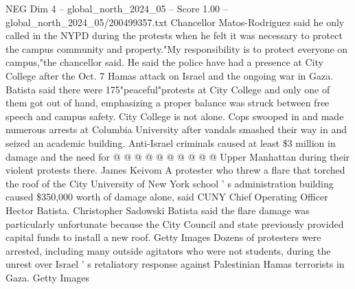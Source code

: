 \begin{textsample}{NEG Dim 4 – global\_north\_2024\_05 – Score 1.00 – global\_north\_2024\_05/200499357.txt}
Chancellor Matos-Rodriguez said he only called in the NYPD during the protests when he felt it was necessary to protect the campus community and property."My responsibility is to protect everyone on campus,"the chancellor said.
He said the police have had a presence at City College after the Oct. 7 Hamas attack on Israel and the ongoing war in Gaza.
Batista said there were 175"peaceful"protests at City College and only one of them got out of hand, emphasizing a proper balance was struck between free speech and campus safety.
City College is not alone.
Cops swooped in and made numerous arrests at Columbia University after vandals smashed their way in and seized an academic building.
Anti-Israel criminals caused at least \$3 million in damage and the need for @ @ @ @ @ @ @ @ @ @ Upper Manhattan during their violent protests there.
James Keivom A protester who threw a flare that torched the roof of the City University of New York school ' s administration building caused \$350,000 worth of damage alone, said CUNY Chief Operating Officer Hector Batista.
Christopher Sadowski Batista said the flare damage was particularly unfortunate because the City Council and state previously provided capital funds to install a new roof.
Getty Images Dozens of protesters were arrested, including many outside agitators who were not students, during the unrest over Israel ' s retaliatory response against Palestinian Hamas terrorists in Gaza.
Getty Images

\end{textsample}
